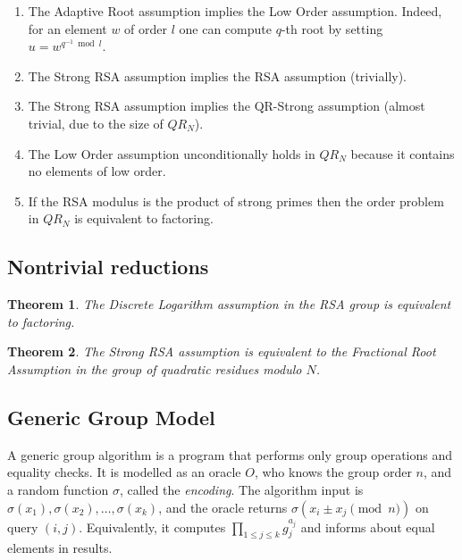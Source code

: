\documentclass[a4paper]{article}
\newtheorem{theorem}{Theorem}
\begin{document}
\begin{enumerate}
    \item The Adaptive Root assumption implies the Low Order assumption. Indeed, for an element $w$ of order $l$ one can compute $q$-th root by setting $u = w^{q^{-1}\bmod{l}}$. 
    \item The Strong RSA assumption implies the RSA assumption (trivially).
    \item The Strong RSA assumption implies the QR-Strong assumption (almost trivial, due to the size of $QR_N$).
    \item The Low Order assumption unconditionally holds in $QR_N$ because it contains no elements of low order.
    \item If the RSA modulus is the product of strong primes then the order problem in $QR_N$ is equivalent to factoring.
\end{enumerate}

\subsection{Nontrivial reductions}
\begin{theorem}\cite{bach1984discrete}
The Discrete Logarithm assumption in the RSA group is equivalent to factoring.
\end{theorem}

\begin{theorem}\cite[Th. 1]{DBLP:conf/ccs/CramerS99}
The Strong RSA assumption is equivalent to the Fractional Root Assumption in the group of quadratic residues modulo $N$.
\end{theorem}

\subsection{Generic Group Model}

A generic group algorithm is a program that performs only group operations and equality checks. It is modelled as an oracle $O$, who knows the group order $n$, and a random function $\sigma$, called the \emph{encoding}. The algorithm input is $\sigma(x_1),\sigma(x_2),\ldots,\sigma(x_k)$, and the oracle returns $\sigma(x_i\pm x_j\pmod{n})$ on query $(i,j)$. Equivalently, it computes $\prod_{1\leq j \leq k}g_j^{a_j}$ and informs about equal elements in results.
\end{document}
